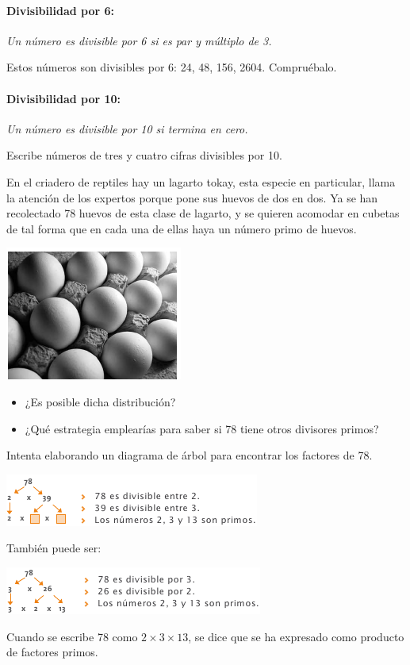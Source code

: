 \documentclass[10pt,twoside]{article}
\begin{document}
\paragraph*{Divisibilidad por 6:} \emph{Un número es divisible por 6 si es par y múltiplo de 3.}

Estos números son divisibles por 6: 24, 48, 156, 2604. Compruébalo.
\paragraph*{Divisibilidad por 10:} \emph{Un número es divisible por 10 si termina en cero.}

Escribe números de tres y cuatro cifras divisibles por 10.

\begin{minipage}{.55\textwidth}
 En el criadero de reptiles hay un lagarto tokay, esta especie
en particular, llama la atención de los expertos porque pone
sus huevos de dos en dos. Ya se han recolectado 78 huevos
de esta clase de lagarto, y se quieren acomodar en cubetas
de tal forma que en cada una de ellas haya un número primo
de huevos.
\end{minipage}
\begin{minipage}{.4\textwidth}
 \begin{center}
 \includegraphics[scale=.85]{./Images/huevos_02.png}
\end{center}
\end{minipage}
\begin{itemize}
 \item  ¿Es posible dicha distribución?
 \item ¿Qué estrategia emplearías para saber si 78 tiene otros divisores primos?
\end{itemize}
Intenta elaborando un diagrama de árbol para encontrar los factores de 78.
\begin{center}
 \includegraphics{./Images/diag_arbol.png}
\end{center}
También puede ser:
\begin{center}
 \includegraphics{./Images/diag_arbol_02.png}
\end{center}
Cuando se escribe 78 como $2 \times 3 \times 13$, se dice que se ha
expresado como producto de factores primos.
\end{document}
